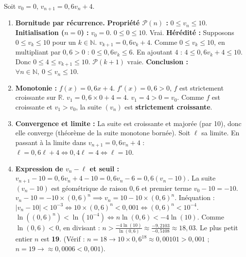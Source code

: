\documentclass[11pt]{article}
\begin{document}
\begin{corrige}
Soit $v_0 = 0$, $v_{n+1} = 0,6 v_n + 4$.
\begin{enumerate}
    \item \textbf{Bornitude par récurrence.}
    \textbf{Propriété $\mathcal{P}(n)$ :} $0 \le v_n \le 10$.
    \textbf{Initialisation ($n=0$) :} $v_0 = 0$. $0 \le 0 \le 10$. Vrai.
    \textbf{Hérédité :} Supposons $0 \le v_k \le 10$ pour un $k \in \mathbb{N}$.
    $v_{k+1} = 0,6 v_k + 4$.
    Comme $0 \le v_k \le 10$, en multipliant par $0,6 > 0$ : $0 \le 0,6 v_k \le 6$.
    En ajoutant $4$ : $4 \le 0,6 v_k + 4 \le 10$.
    Donc $0 \le 4 \le v_{k+1} \le 10$. $\mathcal{P}(k+1)$ vraie.
    \textbf{Conclusion :} $\forall n \in \mathbb{N},\ 0 \le v_n \le 10$.
    \item \textbf{Monotonie :}
    $f(x) = 0,6x + 4$. $f'(x) = 0,6 > 0$, $f$ est strictement croissante sur $\mathbb{R}$.
    $v_1 = 0,6\times 0 + 4 = 4$. $v_1 = 4 > 0 = v_0$.
    Comme $f$ est croissante et $v_1 > v_0$, la suite $(v_n)$ est \textbf{strictement croissante}.
    \item \textbf{Convergence et limite :}
    La suite est croissante et majorée (par 10), donc elle converge (théorème de la suite monotone bornée).
    Soit $\ell$ sa limite. En passant à la limite dans $v_{n+1} = 0,6 v_n + 4$ :
    $\ell = 0,6 \ell + 4 \iff 0,4 \ell = 4 \iff \ell = 10$.
    \item \textbf{Expression de $v_n - \ell$ et seuil :}
    $v_{n+1} - 10 = 0,6 v_n + 4 - 10 = 0,6 v_n - 6 = 0,6(v_n - 10)$.
    La suite $(v_n - 10)$ est géométrique de raison $0,6$ et premier terme $v_0 - 10 = -10$.
    $v_n - 10 = -10 \times (0,6)^n \implies v_n = 10 - 10 \times (0,6)^n$.
    Inéquation : $|v_n - 10| < 10^{-3} \iff 10 \times (0,6)^n < 0,001 \iff (0,6)^n < 10^{-4}$.
    $\ln((0,6)^n) < \ln(10^{-4}) \iff n \ln(0,6) < -4 \ln(10)$.
    Comme $\ln(0,6) < 0$, en divisant : $n > \frac{-4 \ln(10)}{\ln(0,6)} \approx \frac{-9,2103}{-0,5108} \approx 18,03$.
    Le plus petit entier $n$ est \textbf{19}.
    (Vérif : $n=18 \to 10\times 0,6^{18} \approx 0,00101 > 0,001$ ; $n=19 \to \approx 0,0006 < 0,001$).
\end{enumerate}
\end{corrige}
\end{document}
